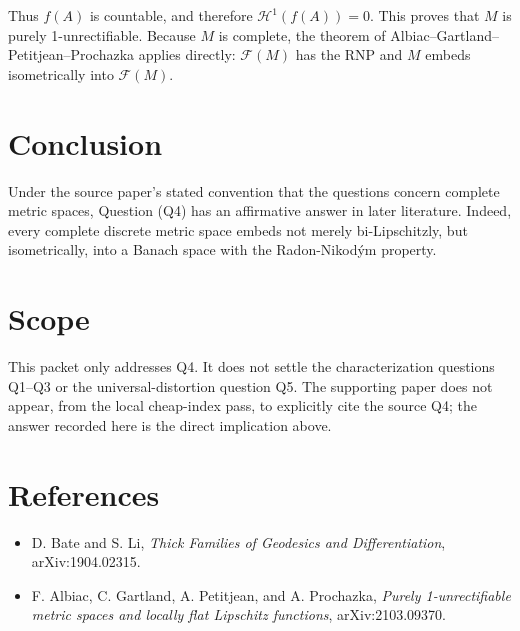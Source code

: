 \documentclass[11pt]{article}
\newcommand{\HH}{\mathcal{H}}
\newcommand{\Free}{\mathcal{F}}
\begin{document}
Thus \(f(A)\) is countable, and therefore \(\HH^1(f(A))=0\).  This proves that
\(M\) is purely 1-unrectifiable.  Because \(M\) is complete, the theorem of
Albiac--Gartland--Petitjean--Prochazka applies directly: \(\Free(M)\) has the
RNP and \(M\) embeds isometrically into \(\Free(M)\).

\section{Conclusion}

Under the source paper's stated convention that the questions concern complete
metric spaces, Question (Q4) has an affirmative answer in later literature.
Indeed, every complete discrete metric space embeds not merely
bi-Lipschitzly, but isometrically, into a Banach space with the
Radon-Nikod\'ym property.

\section{Scope}

This packet only addresses Q4.  It does not settle the characterization
questions Q1--Q3 or the universal-distortion question Q5.  The supporting
paper does not appear, from the local cheap-index pass, to explicitly cite the
source Q4; the answer recorded here is the direct implication above.

\section{References}

\begin{itemize}[leftmargin=*]
\item D. Bate and S. Li, \emph{Thick Families of Geodesics and
Differentiation}, arXiv:1904.02315.
\item F. Albiac, C. Gartland, A. Petitjean, and A. Prochazka, \emph{Purely
1-unrectifiable metric spaces and locally flat Lipschitz functions},
arXiv:2103.09370.
\end{itemize}
\end{document}
